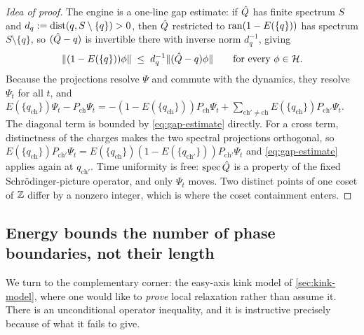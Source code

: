 \begin{proof}[Idea of proof]
The engine is a one-line gap estimate: if $\hat{Q}$ has finite spectrum $S$ and
$d_q:=\operatorname{dist}(q,S\setminus\{q\})>0$, then $\hat{Q}$ restricted to
$\operatorname{ran}(1-E(\{q\}))$ has spectrum $S\setminus\{q\}$, so $(\hat{Q}-q)$ is invertible
there with inverse norm $d_q^{-1}$, giving
\begin{equation}
  \lVert (1-E(\{q\}))\phi\rVert\;\le\;d_q^{-1}\lVert (\hat{Q}-q)\phi\rVert
  \qquad\text{for every }\phi\in\mathcal{H} .
  \label{eq:gap-estimate}
\end{equation}
Because the projections resolve $\Psi$ and commute with the dynamics, they
resolve $\Psi_t$ for all $t$, and
$E(\{q_{\mathrm{ch}}\})\Psi_t-P_{\mathrm{ch}}\Psi_t
=-(1-E(\{q_{\mathrm{ch}}\}))P_{\mathrm{ch}}\Psi_t
+\sum_{\mathrm{ch}'\neq\mathrm{ch}}E(\{q_{\mathrm{ch}}\})
P_{\mathrm{ch}'}\Psi_t$. The diagonal term is bounded by
\eqref{eq:gap-estimate} directly. For a cross term, distinctness of the charges
makes the two spectral projections orthogonal, so
$E(\{q_{\mathrm{ch}}\})P_{\mathrm{ch}'}\Psi_t
=E(\{q_{\mathrm{ch}}\})(1-E(\{q_{\mathrm{ch}'}\}))P_{\mathrm{ch}'}\Psi_t$ and
\eqref{eq:gap-estimate} applies again at $q_{\mathrm{ch}'}$. Time uniformity is
free: $\operatorname{spec}\hat{Q}$ is a property of the fixed Schr\"odinger-picture operator,
and only $\Psi_t$ moves. Two distinct points of one coset of $\mathbb{Z}$ differ by a
nonzero integer, which is where the coset containment enters.
\end{proof}


\subsection{Energy bounds the number of phase boundaries, not their length}
\label{subsec:edw}

We turn to the complementary corner: the easy-axis kink model of
\cref{sec:kink-model}, where one would like to \emph{prove} local relaxation
rather than assume it. There is an unconditional operator inequality, and it
is instructive precisely because of what it fails to give.

